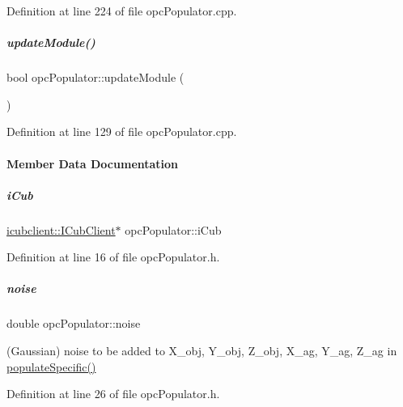 Definition at line 224 of file opc\+Populator.\+cpp.

\mbox{\label{group__opcPopulator_a7b04ad1b8eadd3461062c611341d756d}} 
\subparagraph{\texorpdfstring{update\+Module()}{updateModule()}}
{\footnotesize\ttfamily bool opc\+Populator\+::update\+Module (\begin{DoxyParamCaption}{ }\end{DoxyParamCaption})}



Definition at line 129 of file opc\+Populator.\+cpp.



\paragraph{Member Data Documentation}
\mbox{\label{group__opcPopulator_ae91ad173bd26955fced3acbd7955e860}} 
\subparagraph{\texorpdfstring{i\+Cub}{iCub}}
{\footnotesize\ttfamily \hyperlink{group__icubclient__clients_classicubclient_1_1ICubClient}{icubclient\+::\+I\+Cub\+Client}$\ast$ opc\+Populator\+::i\+Cub\hspace{0.3cm}{\ttfamily [protected]}}



Definition at line 16 of file opc\+Populator.\+h.

\mbox{\label{group__opcPopulator_aeffb7a10bda618b48f14298b671eec2d}} 
\subparagraph{\texorpdfstring{noise}{noise}}
{\footnotesize\ttfamily double opc\+Populator\+::noise\hspace{0.3cm}{\ttfamily [protected]}}



(Gaussian) noise to be added to X\+\_\+obj, Y\+\_\+obj, Z\+\_\+obj, X\+\_\+ag, Y\+\_\+ag, Z\+\_\+ag in \hyperlink{group__opcPopulator_a0fba845edd63a15da94b864022d20ba3}{populate\+Specific()} 



Definition at line 26 of file opc\+Populator.\+h.

